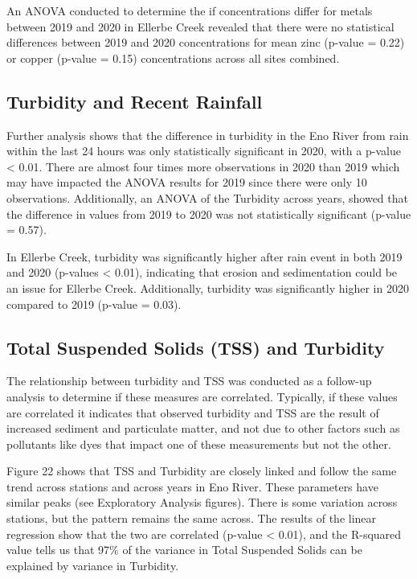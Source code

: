 \documentclass[
  12pt,
]{article}
\begin{document}
An ANOVA conducted to determine the if concentrations differ for metals
between 2019 and 2020 in Ellerbe Creek revealed that there were no
statistical differences between 2019 and 2020 concentrations for mean
zinc (p-value = 0.22) or copper (p-value = 0.15) concentrations across
all sites combined.

\hypertarget{turbidity-and-recent-rainfall}{%
\subsection{Turbidity and Recent
Rainfall}\label{turbidity-and-recent-rainfall}}

Further analysis shows that the difference in turbidity in the Eno River
from rain within the last 24 hours was only statistically significant in
2020, with a p-value \textless{} 0.01. There are almost four times more
observations in 2020 than 2019 which may have impacted the ANOVA results
for 2019 since there were only 10 observations. Additionally, an ANOVA
of the Turbidity across years, showed that the difference in values from
2019 to 2020 was not statistically significant (p-value = 0.57).

In Ellerbe Creek, turbidity was significantly higher after rain event in
both 2019 and 2020 (p-values \textless{} 0.01), indicating that erosion
and sedimentation could be an issue for Ellerbe Creek. Additionally,
turbidity was significantly higher in 2020 compared to 2019 (p-value =
0.03).

\hypertarget{total-suspended-solids-tss-and-turbidity}{%
\subsection{Total Suspended Solids (TSS) and
Turbidity}\label{total-suspended-solids-tss-and-turbidity}}

The relationship between turbidity and TSS was conducted as a follow-up
analysis to determine if these measures are correlated. Typically, if
these values are correlated it indicates that observed turbidity and TSS
are the result of increased sediment and particulate matter, and not due
to other factors such as pollutants like dyes that impact one of these
measurements but not the other.

Figure 22 shows that TSS and Turbidity are closely linked and follow the
same trend across stations and across years in Eno River. These
parameters have similar peaks (see Exploratory Analysis figures). There
is some variation across stations, but the pattern remains the same
across. The results of the linear regression show that the two are
correlated (p-value \textless{} 0.01), and the R-squared value tells us
that 97\% of the variance in Total Suspended Solids can be explained by
variance in Turbidity.
\end{document}
